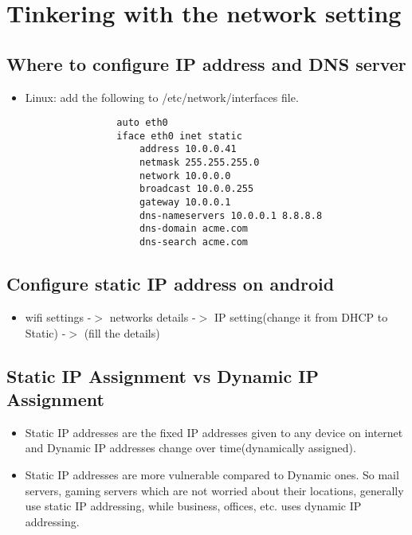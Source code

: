 \documentclass{article}
\begin{document}
\section{Tinkering with the network setting}
\subsection{Where to configure IP address and DNS server}
    \begin{itemize}
        \item Linux: add the following to /etc/network/interfaces file.
            \begin{lstlisting}    
                auto eth0
                iface eth0 inet static    
                    address 10.0.0.41
                    netmask 255.255.255.0
                    network 10.0.0.0
                    broadcast 10.0.0.255
                    gateway 10.0.0.1
                    dns-nameservers 10.0.0.1 8.8.8.8
                    dns-domain acme.com
                    dns-search acme.com
            \end{lstlisting}
    \end{itemize}{}
\subsection{Configure static IP address on android}
    \begin{itemize}
        \item wifi settings -$>$ networks details -$>$ IP setting(change it from DHCP to Static) -$>$ (fill the details)
    \end{itemize}
\subsection{Static IP Assignment vs Dynamic IP Assignment}
    \begin{itemize}
        \item Static IP addresses are the fixed IP addresses given to any device on internet and Dynamic IP addresses change over time(dynamically assigned).
        \item Static IP addresses are more vulnerable compared to Dynamic ones. So mail servers, gaming servers which are not worried about their locations, generally use static IP addressing, while business, offices, etc. uses dynamic IP addressing.
    \end{itemize}
\end{document}
